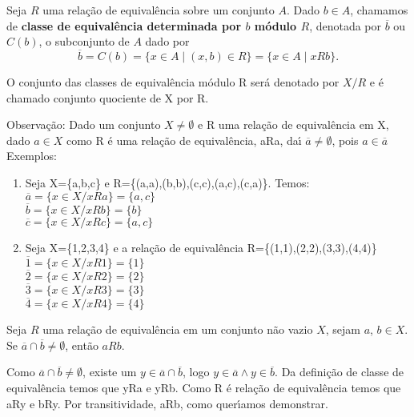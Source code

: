 \begin{definicao}
	Seja $R$ uma rela{\c c}{\~a}o de equival{\^e}ncia sobre um conjunto $A$. Dado $b \in A$, chamamos de \textbf{classe de equival{\^e}ncia determinada por $b$ m{\'o}dulo $R$}, denotada por $\overline{b}$ ou $C(b)$, o subconjunto de $A$ dado por
	\[
		\overline{b} = C(b) = \{x \in A \mid (x,b) \in R\} = \{x \in A \mid xRb\}.
	\]
\end{definicao}

\begin{definicao}
O conjunto das classes de equival{\^e}ncia m{\'o}dulo R ser{\'a} denotado por $X/R$ e {\'e} chamado conjunto quociente de X por R.
\end{definicao}

Observa{\c c}{\~a}o: Dado um conjunto $X\neq\emptyset$ e R uma rela{\c c}{\~a}o de equival{\^e}ncia em X, dado $a\in X$ como R {\'e} uma rela{\c c}{\~a}o de equival{\^e}ncia, aRa, da{\'\i} $\overline{a}\neq\emptyset$, pois $a\in\overline{a}$\\

Exemplos:
\begin{enumerate}
\item Seja X=\{a,b,c\} e R=\{(a,a),(b,b),(c,c),(a,c),(c,a)\}. Temos:\\
$\overline{a}=\{x\in X/xRa\}=\{a,c\}$\\
$\overline{b}=\{x\in X/xRb\}=\{b\}$\\
$\overline{c}=\{x\in X/xRc\}=\{a,c\}$
\item Seja X=\{1,2,3,4\} e a rela{\c c}{\~a}o de equival{\^e}ncia R=\{(1,1),(2,2),(3,3),(4,4)\}\\
$\overline{1}=\{x\in X/xR1\}=\{1\}$\\
$\overline{2}=\{x\in X/xR2\}=\{2\}$\\
$\overline{3}=\{x\in X/xR3\}=\{3\}$\\
$\overline{4}=\{x\in X/xR4\}=\{4\}$
\end{enumerate}

\begin{proposicao}
	Seja $R$ uma rela{\c c}{\~a}o de equival{\^e}ncia em um conjunto n{\~a}o vazio $X$, sejam $a$, $b \in X$. Se $\overline{a}\cap\overline{b}\neq\emptyset$, ent{\~a}o $aRb$.
\end{proposicao}
\begin{prova}
	Como  $\overline{a}\cap\overline{b}\neq\emptyset$, existe um $y\in\overline{a}\cap\overline{b}$, logo $y\in\overline{a}\wedge y\in\overline{b}$. Da defini{\c c}{\~a}o de classe de equival{\^e}ncia temos que yRa e yRb. Como R {\'e} rela{\c c}{\~a}o de equival{\^e}ncia temos que aRy e bRy. Por transitividade, aRb, como quer{\'\i}amos demonstrar.
\end{prova}

